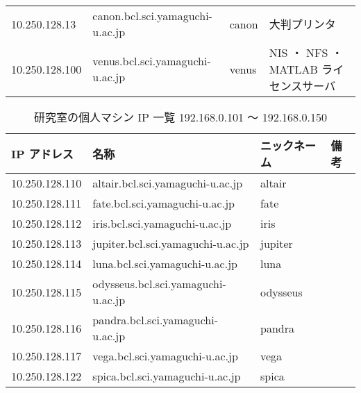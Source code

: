 \documentclass{jarticle}
\begin{document}
{\begin{table}[tbp]
\begin{tabular}[t]{llll}
10.250.128.13 &	canon.bcl.sci.yamaguchi-u.ac.jp &	canon &		大判プリンタ \\
10.250.128.100 &	venus.bcl.sci.yamaguchi-u.ac.jp &	venus &		NIS ・ NFS ・ MATLAB ライセンスサーバ\\
\hline
\end{tabular}
\end{table}
}
{\small
\begin{table}[tbp]
\centering
\caption{研究室の個人マシン IP 一覧 192.168.0.101 〜 192.168.0.150 } \label{tab:IP2}
\begin{tabular}[t]{llll}\hline
IP アドレス &	名称 &					ニックネーム &	備考 \\ \hline
10.250.128.110 & altair.bcl.sci.yamaguchi-u.ac.jp &	altair & \\
10.250.128.111 &	fate.bcl.sci.yamaguchi-u.ac.jp &	fate & \\
10.250.128.112 &	iris.bcl.sci.yamaguchi-u.ac.jp &	iris & \\
10.250.128.113 &	jupiter.bcl.sci.yamaguchi-u.ac.jp &	jupiter & \\
10.250.128.114 &	luna.bcl.sci.yamaguchi-u.ac.jp &	luna & \\
10.250.128.115 &	odysseus.bcl.sci.yamaguchi-u.ac.jp &	odysseus & \\
10.250.128.116 &	pandra.bcl.sci.yamaguchi-u.ac.jp &	pandra & \\
10.250.128.117 &	vega.bcl.sci.yamaguchi-u.ac.jp &	vega & \\
10.250.128.122 &	spica.bcl.sci.yamaguchi-u.ac.jp &	spica & \\

\hline
\end{tabular}
\end{table}
}
\end{document}
